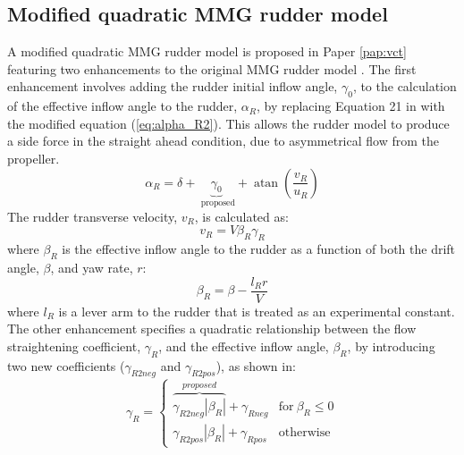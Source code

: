 \subsection{Modified quadratic MMG rudder model} \label{sec:MMG_rudder}
A modified quadratic MMG rudder model is proposed in Paper \ref{pap:vct} featuring two enhancements to the original MMG rudder model \cite{yasukawaIntroductionMMGStandard2015}. The first enhancement involves adding the rudder initial inflow angle, $\gamma_0$, to the calculation of the effective inflow angle to the rudder, $\alpha_R$, by replacing Equation 21 in \textcite{yasukawaIntroductionMMGStandard2015} with the modified equation (\autoref{eq:alpha_R2}). This allows the rudder model to produce a side force in the straight ahead condition, due to asymmetrical flow from the propeller. 
\begin{equation}
    \label{eq:alpha_R2}
    \alpha_{R} = \delta + \underbrace{\gamma_{0}}_{\text{ proposed}} + \operatorname{atan}{\left(\frac{v_{R}}{u_{R}} \right)}
\end{equation}
The rudder transverse velocity, $v_R$, is calculated as:
\begin{equation}
    \label{eq:gamma_R2}
    v_{R} = V \beta_{R} \gamma_{R}
\end{equation}
where $\beta_R$ is the effective inflow angle to the rudder as a function of both the drift angle, $\beta$, and yaw rate, $r$:
\begin{equation}
    \label{eq:beta_R}
    \beta_{R} = \beta - \frac{l_{R} r}{V}
\end{equation}
where $l_R$ is a lever arm to the rudder that is treated as an experimental constant.
The other enhancement specifies a quadratic relationship between the flow straightening coefficient, $\gamma_R$, and the effective inflow angle, $\beta_R$, by introducing two new coefficients ($\gamma_{R2neg}$ and $\gamma_{R2pos}$), as shown in:  
\begin{equation}
    \label{eq:gamma_R2}
    \gamma_{R} = \begin{cases} \overbrace{\gamma_{R2 neg} \left|{\beta_{R}}\right|}^{proposed} +   
    \gamma_{R neg} & \text{for}\: \beta_{R} \leq 0 \\\gamma_{R2 pos} \left| 
    {\beta_{R}}\right| + \gamma_{R pos} & \text{otherwise} \end{cases}
\end{equation}